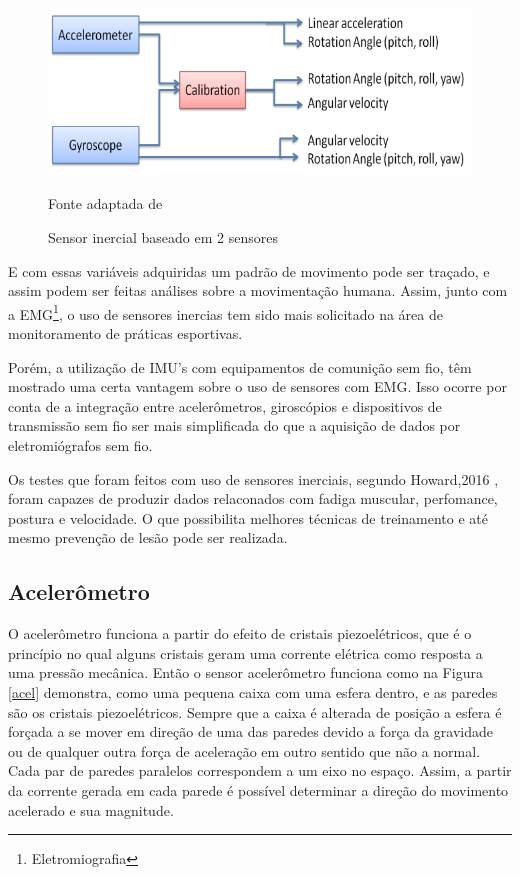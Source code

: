 \begin{figure}[h]
	\centering
	\includegraphics[keepaspectratio=true,scale=0.3
	]{figuras/integracao_imu.png}
	\caption{Sensor inercial baseado em 2 sensores}
	Fonte adaptada de \cite{ahmad2013}
	\label{integracao_imu}
	
\end{figure}

E com essas variáveis adquiridas um padrão de movimento pode ser traçado, e assim podem ser feitas análises sobre a movimentação humana. Assim, junto com a EMG\footnote{Eletromiografia}, o uso de sensores inercias tem sido mais solicitado na área de monitoramento de práticas esportivas\cite{howard2016}.

Porém, a utilização de IMU's com equipamentos de comunição sem fio, têm mostrado uma certa vantagem sobre o uso de sensores com EMG. Isso ocorre por conta de a integração entre acelerômetros, giroscópios e dispositivos de transmissão sem fio ser mais simplificada do que a aquisição de dados por eletromiógrafos sem fio\cite{howard2016}. 

Os testes que foram feitos com uso de sensores inerciais, segundo  Howard,2016 , foram capazes de produzir dados relaconados com fadiga muscular, perfomance, postura e velocidade. O que possibilita melhores técnicas de treinamento e até mesmo prevenção de lesão pode ser realizada.

\subsection{Acelerômetro}

O acelerômetro funciona a partir do efeito de cristais piezoelétricos, que é o princípio no qual alguns cristais geram uma corrente elétrica como resposta a uma pressão mecânica. Então o sensor acelerômetro  funciona como na Figura \ref{acel} demonstra, como uma pequena caixa com uma esfera dentro, e as paredes são os cristais piezoelétricos.  Sempre que a caixa é alterada de posição a esfera é forçada a se mover em direção de uma das paredes devido a força da gravidade ou de qualquer outra força de aceleração em outro sentido que não a normal. Cada par de paredes paralelos correspondem a um eixo no espaço. Assim, a partir da corrente gerada em cada parede é possível determinar a direção do movimento acelerado e sua magnitude\cite{sanjeev2018}.

